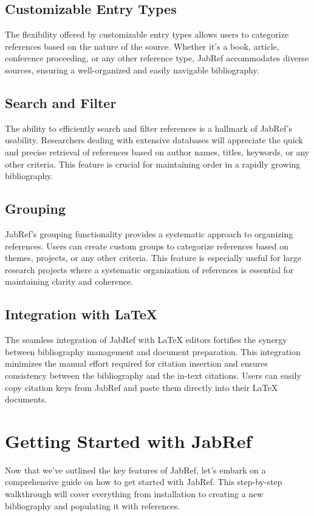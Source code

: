 		\subsection{Customizable Entry Types}
			The flexibility offered by customizable entry types allows users to categorize references based on the nature of the source. 
			Whether it's a book, article, conference proceeding, or any other reference type, JabRef accommodates diverse sources, ensuring a well-organized and easily navigable bibliography.

		\subsection{Search and Filter}
			The ability to efficiently search and filter references is a hallmark of JabRef's usability. 
			Researchers dealing with extensive databases will appreciate the quick and precise retrieval of references based on author names, titles, keywords, or any other criteria. 
			This feature is crucial for maintaining order in a rapidly growing bibliography.

		\subsection{Grouping}
			JabRef's grouping functionality provides a systematic approach to organizing references. 
			Users can create custom groups to categorize references based on themes, projects, or any other criteria. 
			This feature is especially useful for large research projects where a systematic organization of references is essential for maintaining clarity and coherence.

		\subsection{Integration with \LaTeX{}}
			The seamless integration of JabRef with \LaTeX{} editors fortifies the synergy between bibliography management and document preparation. 
			This integration minimizes the manual effort required for citation insertion and ensures consistency between the bibliography and the in-text citations. 
			Users can easily copy citation keys from JabRef and paste them directly into their \LaTeX{} documents.

	\section{Getting Started with JabRef}
		Now that we've outlined the key features of JabRef, let's embark on a comprehensive guide on how to get started with JabRef. 
		This step-by-step walkthrough will cover everything from installation to creating a new bibliography and populating it with references.

